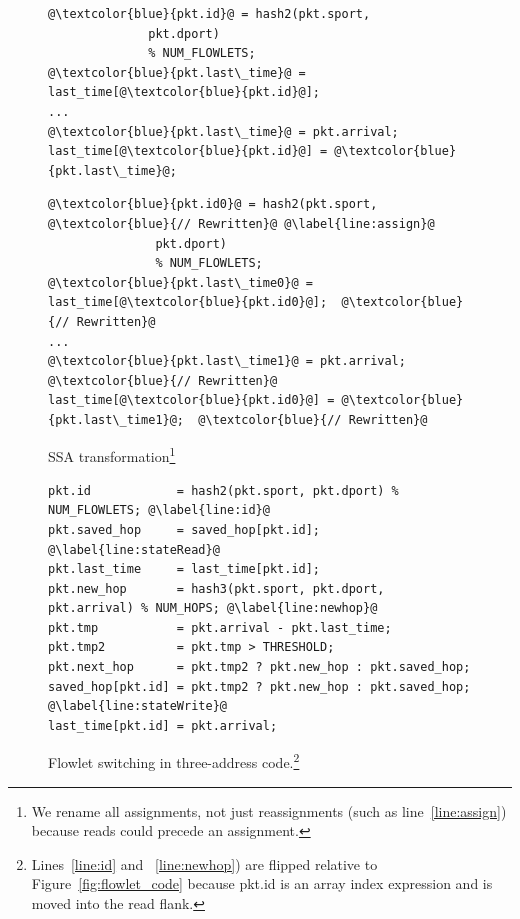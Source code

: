 \begin{figure}[!t]
  \begin{minipage}{\textwidth}
  \begin{minipage}{0.43\textwidth}
  \begin{small}
  \begin{lstlisting}[style=customc]
@\textcolor{blue}{pkt.id}@ = hash2(pkt.sport,
              pkt.dport)
              % NUM_FLOWLETS;
@\textcolor{blue}{pkt.last\_time}@ = last_time[@\textcolor{blue}{pkt.id}@];
...
@\textcolor{blue}{pkt.last\_time}@ = pkt.arrival;
last_time[@\textcolor{blue}{pkt.id}@] = @\textcolor{blue}{pkt.last\_time}@;
  \end{lstlisting}
  \end{small}
  \end{minipage}
  \begin{minipage}{0.57\textwidth}
  \begin{small}
  \begin{lstlisting}[style=customc]
  @\textcolor{blue}{pkt.id0}@ = hash2(pkt.sport, @\textcolor{blue}{// Rewritten}@ @\label{line:assign}@
               pkt.dport)
               % NUM_FLOWLETS;
@\textcolor{blue}{pkt.last\_time0}@ = last_time[@\textcolor{blue}{pkt.id0}@];  @\textcolor{blue}{// Rewritten}@
...
@\textcolor{blue}{pkt.last\_time1}@ = pkt.arrival;  @\textcolor{blue}{// Rewritten}@
last_time[@\textcolor{blue}{pkt.id0}@] = @\textcolor{blue}{pkt.last\_time1}@;  @\textcolor{blue}{// Rewritten}@
  \end{lstlisting}
  \end{small}
  \end{minipage}
  \caption[title]{SSA transformation\footnote{We rename all assignments, not just reassignments (such as line~\ref{line:assign}) because reads could precede an assignment.}}
  \label{fig:ssa}
\end{minipage}
\end{figure}
\begin{figure}[!t]
\begin{minipage}{\textwidth}
\begin{lstlisting}[style=customc]
pkt.id            = hash2(pkt.sport, pkt.dport) % NUM_FLOWLETS; @\label{line:id}@
pkt.saved_hop     = saved_hop[pkt.id]; @\label{line:stateRead}@
pkt.last_time     = last_time[pkt.id];
pkt.new_hop       = hash3(pkt.sport, pkt.dport, pkt.arrival) % NUM_HOPS; @\label{line:newhop}@
pkt.tmp           = pkt.arrival - pkt.last_time;
pkt.tmp2          = pkt.tmp > THRESHOLD;
pkt.next_hop      = pkt.tmp2 ? pkt.new_hop : pkt.saved_hop;
saved_hop[pkt.id] = pkt.tmp2 ? pkt.new_hop : pkt.saved_hop; @\label{line:stateWrite}@
last_time[pkt.id] = pkt.arrival;
\end{lstlisting}
\caption[title2]{Flowlet switching in three-address
code.\footnote{Lines~\ref{line:id} and ~\ref{line:newhop}) are flipped relative
  to Figure~\ref{fig:flowlet_code} because pkt.id is an array index expression and is
moved into the read flank.}}
\label{fig:three_address}
\end{minipage}
\vspace{-0.5cm}
\end{figure}

